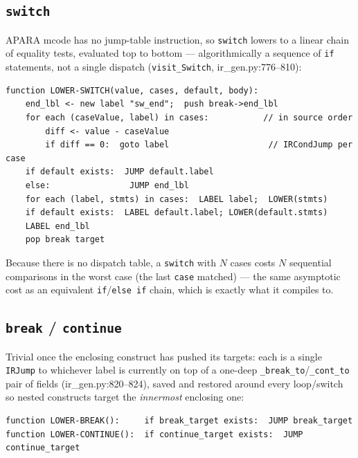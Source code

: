 \documentclass[11pt,a4paper]{article}
\begin{document}
\subsection*{\texttt{switch}}
APARA mcode has no jump-table instruction, so \texttt{switch} lowers to a linear chain of
equality tests, evaluated top to bottom --- algorithmically a sequence of \texttt{if}
statements, not a single dispatch (\texttt{visit\_Switch}, ir\_gen.py:776--810):
\begin{lstlisting}[style=pseudostyle]
function LOWER-SWITCH(value, cases, default, body):
    end_lbl <- new label "sw_end";  push break->end_lbl
    for each (caseValue, label) in cases:           // in source order
        diff <- value - caseValue
        if diff == 0:  goto label                    // IRCondJump per case
    if default exists:  JUMP default.label
    else:                JUMP end_lbl
    for each (label, stmts) in cases:  LABEL label;  LOWER(stmts)
    if default exists:  LABEL default.label; LOWER(default.stmts)
    LABEL end_lbl
    pop break target
\end{lstlisting}
Because there is no dispatch table, a \texttt{switch} with $N$ cases costs $N$ sequential
comparisons in the worst case (the last \texttt{case} matched) --- the same asymptotic cost
as an equivalent \texttt{if}/\texttt{else if} chain, which is exactly what it compiles to.

\subsection*{\texttt{break} / \texttt{continue}}
Trivial once the enclosing construct has pushed its targets: each is a single
\texttt{IRJump} to whichever label is currently on top of a one-deep
\texttt{\_break\_to}/\texttt{\_cont\_to} pair of fields (ir\_gen.py:820--824), saved and
restored around every loop/switch so nested constructs target the \emph{innermost}
enclosing one:
\begin{lstlisting}[style=pseudostyle]
function LOWER-BREAK():     if break_target exists:  JUMP break_target
function LOWER-CONTINUE():  if continue_target exists:  JUMP continue_target
\end{lstlisting}
\end{document}

